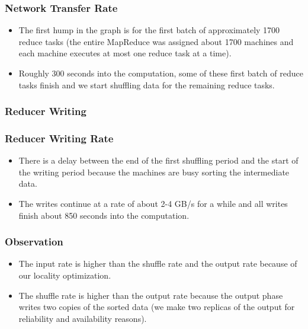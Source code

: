 \documentclass{beamer}
\begin{document}
\begin{frame}
  \frametitle{Network Transfer Rate}
  \begin{itemize}
    \item The first hump in the graph is for the first batch of
      approximately 1700 reduce tasks (the entire MapReduce was
      assigned about 1700 machines and each machine executes at most
      one reduce task at a time).
    \item Roughly 300 seconds into the computation, some of these
      first batch of reduce tasks finish and we start shuffling data
      for the remaining reduce tasks.
  \end{itemize}
\end{frame}

\begin{frame}
\frametitle{Reducer Writing}
\centerline{}
\end{frame}

\begin{frame}
  \frametitle{Reducer Writing Rate}
  \begin{itemize}
    \item There is a delay between the end of the first shuffling
      period and the start of the writing period because the machines
      are busy sorting the intermediate data.
    \item The writes continue at a rate of about 2-4 GB/s for a while
      and all writes finish about 850 seconds into the computation.
  \end{itemize}
\end{frame}

\begin{frame}
  \frametitle{Observation}
  \begin{itemize}
    \item The input rate is higher than the shuffle rate and the
      output rate because of our locality optimization.
    \item The shuffle rate is higher than the output rate because the
      output phase writes two copies of the sorted data (we make two
      replicas of the output for reliability and availability
      reasons).
  \end{itemize}
\end{frame}
\end{document}
